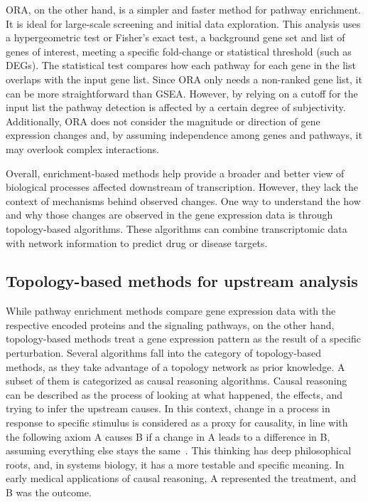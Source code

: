 \gls{ORA}, on the other hand, is a simpler and faster method for pathway enrichment. It is ideal for large-scale screening and initial data exploration. This analysis uses a hypergeometric test or Fisher's exact test, a background gene set and list of genes of interest, meeting a specific fold-change or statistical threshold (such as \gls{DEGs}).
The statistical test compares how each pathway for each gene in the list overlaps with the input gene list.
Since \gls{ORA} only needs a non-ranked gene list, it can be more straightforward than \gls{GSEA}.
However, by relying on a cutoff for the input list the pathway detection is affected by a certain degree of subjectivity. 
Additionally, \gls{ORA} does not consider the magnitude or direction of gene expression changes and, by assuming independence among genes and pathways, it may overlook complex interactions. 

Overall, enrichment-based methods help provide a broader and better view of biological processes affected downstream of transcription. However, they lack the context of mechanisms behind observed changes.
One way to understand the how and why those changes are observed in the gene expression data is through topology-based algorithms.
These algorithms can combine transcriptomic data with network information to predict drug or disease targets.


\subsection{Topology-based methods for upstream analysis} %
\label{sub:topologybasedmethodsforupstreamanalysis}

While pathway enrichment methods compare gene expression data with the respective encoded proteins and the signaling pathways, on the other hand, topology-based methods treat a gene expression pattern as the result of a specific perturbation. 
Several algorithms fall into the category of topology-based methods, as they take advantage of a topology network as prior knowledge. 
A subset of them is categorized as causal reasoning algorithms. 
Causal reasoning can be described as the process of looking at what happened, the effects, and trying to infer the upstream causes. 
In this context, change in a process in response to specific stimulus is considered as a proxy for causality, in line with the following axiom A causes B if a change in A leads to a difference in B, assuming everything else stays the same~\cite{RN157}. 
This thinking has deep philosophical roots, and, in systems biology, it has a more testable and specific meaning. 
In early medical applications of causal reasoning, A represented the treatment, and B was the outcome. 

